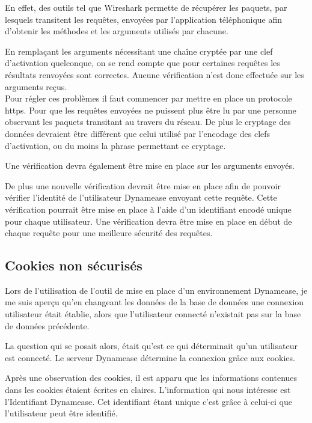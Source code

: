 En effet, des outils tel que Wireshark permette de récupérer les paquets, par lesquels transitent les requêtes, envoyées par l'application téléphonique afin d'obtenir les méthodes et les arguments utilisés par chacune.

En remplaçant les arguments nécessitant une chaîne cryptée par une clef d'activation quelconque, on se rend compte que pour certaines requêtes les résultats renvoyées sont correctes. Aucune vérification n'est donc effectuée sur les arguments reçus.\\

Pour régler ces problèmes il faut commencer par mettre en place un protocole https. Pour que les requêtes envoyées ne puissent plus être lu par une personne observant les paquets transitant au travers du réseau. De plus le cryptage des données devraient être différent que celui utilisé par l'encodage des clefs d'activation, ou du moins la phrase permettant ce cryptage.

Une vérification devra également être mise en place sur les arguments envoyés.

De plus une nouvelle vérification devrait être mise en place afin de pouvoir vérifier l'identité de l'utilisateur Dynamease envoyant cette requête. Cette vérification pourrait être mise en place à l'aide d'un identifiant encodé unique pour chaque utilisateur. Une vérification devra être mise en place en début de chaque requête pour une meilleure sécurité des requêtes.

\subsection{Cookies non sécurisés}

Lors de l'utilisation de l'outil de mise en place d'un environnement Dynamease, je me suis aperçu qu'en changeant les données de la base de données une connexion utilisateur était établie, alors que l'utilisateur connecté n'existait pas sur la base de données précédente.

La question qui se posait alors, était qu'est ce qui déterminait qu'un utilisateur est connecté. Le serveur Dynamease détermine la connexion grâce aux cookies.

Après une observation des cookies, il est apparu que les informations contenues dans les cookies étaient écrites en claires. L'information qui nous intéresse est l'Identifiant Dynamease. Cet identifiant étant unique c'est grâce à celui-ci que l'utilisateur peut être identifié.

